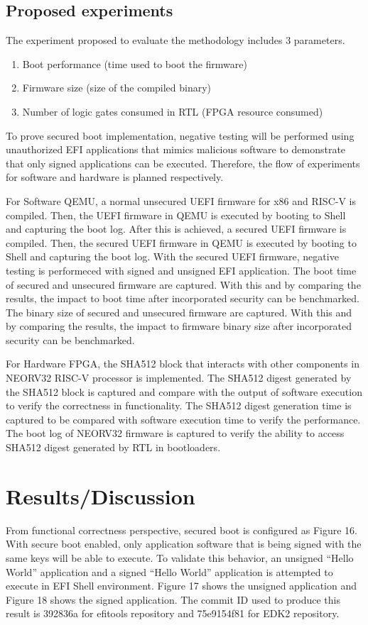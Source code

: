 \documentclass[a4paper,fleqn]{cas-dc}
\begin{document}
\subsection{ Proposed experiments}
The experiment proposed to evaluate the methodology includes 3 parameters.
\begin{enumerate}
\itemsep=-1pt 		%
\itemindent=0pt 	%
\item 
Boot performance (time used to boot the firmware)
\item 
Firmware size (size of the compiled binary)
\item 
Number of logic gates consumed in RTL (FPGA resource consumed)
\end{enumerate}

To prove secured boot implementation, negative testing will be performed using unauthorized EFI applications that mimics malicious software to demonstrate that only signed applications can be executed. Therefore, the flow of experiments for software and hardware is planned respectively.

For Software QEMU, a normal unsecured UEFI firmware for x86 and RISC-V is compiled. Then, the UEFI firmware in QEMU is executed by booting to Shell and capturing the boot log.
After this is achieved, a secured UEFI firmware is compiled. Then, the secured UEFI firmware in QEMU is executed by booting to Shell and capturing the boot log.
With the secured UEFI firmware, negative testing is performeced with signed and unsigned EFI application.
The boot time of secured and unsecured firmware are captured. With this and by comparing the results, the impact to boot time after incorporated security can be benchmarked.
The binary size of secured and unsecured firmware are captured. With this and by comparing the results, the impact to firmware binary size after incorporated security can be benchmarked.

For Hardware FPGA, the SHA512 block that interacts with other components in NEORV32 RISC-V processor is implemented.
The SHA512 digest generated by the SHA512 block is captured and compare with the output of software execution to verify the correctness in functionality.
The SHA512 digest generation time is captured to be compared with software execution time to verify the performance.
The boot log of NEORV32 firmware is captured to verify the ability to access SHA512 digest generated by RTL in bootloaders.


\section{ Results/Discussion}
From functional correctness perspective, secured boot is configured as Figure 16. With secure boot enabled, only application software that is being signed with the same keys will be able to execute. To validate this behavior, an unsigned “Hello World” application and a signed “Hello World” application is attempted to execute in EFI Shell environment. Figure 17 shows the unsigned application and Figure 18 shows the signed application. The commit ID used to produce this result is 392836a for efitools repository and 75e9154f81 for EDK2 repository.
\end{document}
